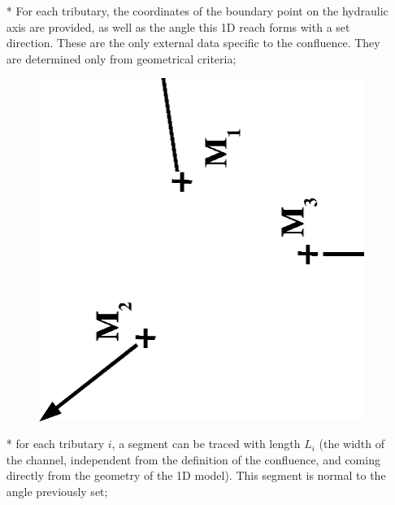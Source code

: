 \begin{itemize}
 \item[*] For each tributary, the coordinates of the boundary point on the hydraulic axis are provided, as well as the angle this 1D reach forms with a set direction. These are the only external data specific to the confluence. They are determined only from geometrical criteria;
  \begin{figure}[h]
    \begin{center}
     \includegraphics[scale=0.4,angle=270]{Figures/cr1.eps}
    \end{center}
  \end{figure}
  \vspace{0.5cm}
 \item[*] for each tributary $i$, a segment can be traced with length $L_i$ (the width of the channel, independent from the definition of the confluence, and coming directly from the geometry of the 1D model). This segment is normal to the angle previously set;
  \begin{figure}[h]
    \begin{center}

\end{center}
\end{figure}
\end{itemize}

